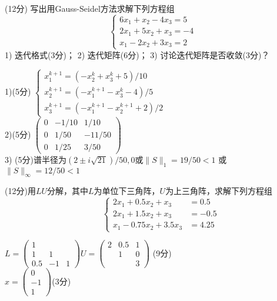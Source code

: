 \documentclass[12pt,letter]{ustcexam}
\begin{document}
\begin{problems}

\newpage
\qu (12分)  写出用Gauss-Seidel方法求解下列方程组
$$\begin {cases} 6x_1+x_2-4x_3=5\\ 2 x_1+5x_2+ x_3=-4 \\ x_1-2x_2+3x_3=2
\end{cases}$$
1) 迭代格式(3分)；  2) 迭代矩阵(6分)； 3) 讨论迭代矩阵是否收敛(3分)？
\begin{sol}
1)(5分)
$
\left\{\begin{array}{l}
x_1^{k+1}=(-x_2^k+x_3^k+5)/10 \\
x_2^{k+1}=(-x_1^{k+1}-x_3^k-4)/5 \\
x_3^{k+1}=(-x_1^{k+1}-x_2^{k+1}+2)/2
\end{array}\right.
$ \\
2)(5分)
$
\left(\begin{array}{ccc}
0 & -1/10 & 1/10 \\
0 & 1/50 & -11/50 \\
0 & 1/25 & 3/50
\end{array}\right)
$ \\
3) (5分)谱半径为$(2\pm i\sqrt{21})/50,0$或$\|S\|_1=19/50<1$
   或$\|S\|_{\infty}=12/50<1$
\end{sol}

\newpage
\qu (12分)用$LU$分解，其中$L$为单位下三角阵，$U$为上三角阵，求解下列方程组
\[  \qquad \begin{cases}
2x_1+ 0.5x_2 + x_3&=0.5 \\
2x_1+ 1.5x_2 + x_3&=-0.5\\
x_1-0.75x_2 + 3.5x_3&=4.25
\end{cases}\]
\begin{sol}
$
L=
\left(\begin{array}{ccc}
1 &  &  \\
1 & 1 &  \\
0.5 & -1 & 1
\end{array}\right)
U=
\left(\begin{array}{ccc}
2 & 0.5  & 1 \\
 & 1 & 0  \\
 &  & 3
\end{array}\right)
$
(9分)\\
$
x=
\left(\begin{array}{l}
0 \\
-1 \\
1
\end{array}\right)
$(3分)
\end{sol}


\end{problems}
\end{document}
